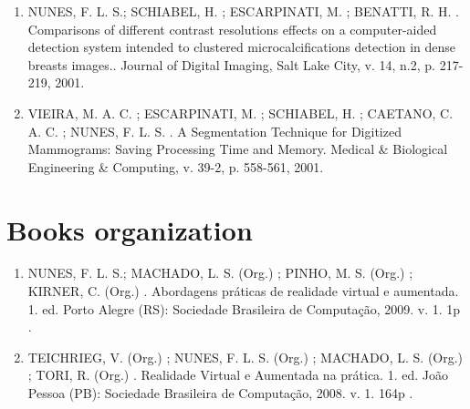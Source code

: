 \documentclass[11pt,a4paper,sans]{moderncv} %
\begin{document}
\begin{enumerate}
    \item NUNES, F. L. S.; SCHIABEL, H. ; ESCARPINATI, M. ; BENATTI, R. H. . Comparisons of different contrast resolutions effects on a computer-aided detection system intended to clustered microcalcifications detection in dense breasts images.. Journal of Digital Imaging, Salt Lake City, v. 14, n.2, p. 217-219, 2001.
    \item VIEIRA, M. A. C. ; ESCARPINATI, M. ; SCHIABEL, H. ; CAETANO, C. A. C. ; NUNES, F. L. S. . A Segmentation Technique for Digitized Mammograms: Saving Processing Time and Memory. Medical \& Biological Engineering \& Computing, v. 39-2, p. 558-561, 2001.
\end{enumerate}

\section{Books organization}
\footnotesize
\begin{enumerate}
    \item NUNES, F. L. S.; MACHADO, L. S. (Org.) ; PINHO, M. S. (Org.) ; KIRNER, C. (Org.) . Abordagens práticas de realidade virtual e aumentada. 1. ed. Porto Alegre (RS): Sociedade Brasileira de Computação, 2009. v. 1. 1p .
    \item TEICHRIEG, V. (Org.) ; NUNES, F. L. S. (Org.) ; MACHADO, L. S. (Org.) ; TORI, R. (Org.) . Realidade Virtual e Aumentada na prática. 1. ed. João Pessoa (PB): Sociedade Brasileira de Computação, 2008. v. 1. 164p .
\end{enumerate}
\end{document}
